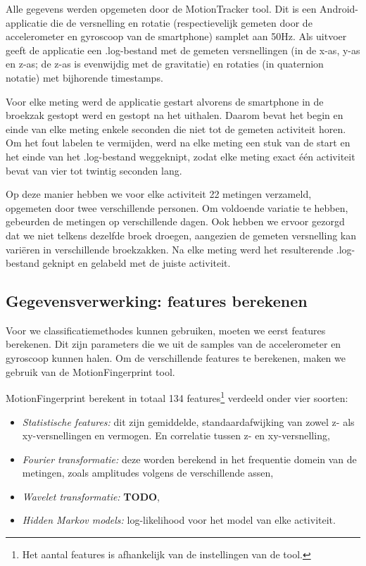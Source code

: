 \documentclass{article}
\begin{document}
Alle gegevens werden opgemeten door de MotionTracker tool. %
Dit is een Android-applicatie die de versnelling en rotatie (respectievelijk gemeten door de accelerometer en gyroscoop van de smartphone) samplet aan 50Hz.  Als uitvoer geeft de applicatie een .log-bestand met de gemeten versnellingen (in de x-as, y-as en z-as; de z-as is evenwijdig met de gravitatie) en rotaties (in quaternion notatie) met bijhorende timestamps.

Voor elke meting werd de applicatie gestart alvorens de smartphone in de broekzak gestopt werd en gestopt na het uithalen. Daarom bevat het begin en einde van elke meting enkele seconden die niet tot de gemeten activiteit horen. Om het fout labelen te vermijden, werd na elke meting een stuk van de start en het einde van het .log-bestand weggeknipt, zodat elke meting exact \'e\'en activiteit bevat van vier tot twintig seconden lang. 

Op deze manier hebben we voor elke activiteit 22 metingen verzameld, opgemeten door twee verschillende personen. Om voldoende variatie te hebben, gebeurden de metingen op verschillende dagen. Ook hebben we ervoor gezorgd dat we niet telkens dezelfde broek droegen, aangezien de gemeten versnelling kan vari\"eren in verschillende broekzakken. Na elke meting werd het resulterende .log-bestand geknipt en gelabeld met de juiste activiteit.


\subsection{Gegevensverwerking: features berekenen}

Voor we classificatiemethodes kunnen gebruiken, moeten we eerst features berekenen. Dit zijn parameters die we uit de samples van de accelerometer en gyroscoop kunnen halen. Om de verschillende features te berekenen, maken we gebruik van de MotionFingerprint tool. %



MotionFingerprint berekent in totaal 134 features\footnote{Het aantal features is afhankelijk van de instellingen van de tool.} verdeeld onder vier soorten:
\begin{itemize}
\item \textit{Statistische features:}
 dit zijn gemiddelde, standaardafwijking van zowel z- als xy-versnellingen en vermogen. En correlatie tussen z- en xy-versnelling,
 
\item \textit{Fourier transformatie:} deze worden berekend in het frequentie domein van de metingen, zoals amplitudes volgens de verschillende assen,

\item \textit{Wavelet transformatie:} \textbf{TODO}, %

\item \textit{Hidden Markov models:} log-likelihood voor het model van elke activiteit.
\end{itemize}
\end{document}
